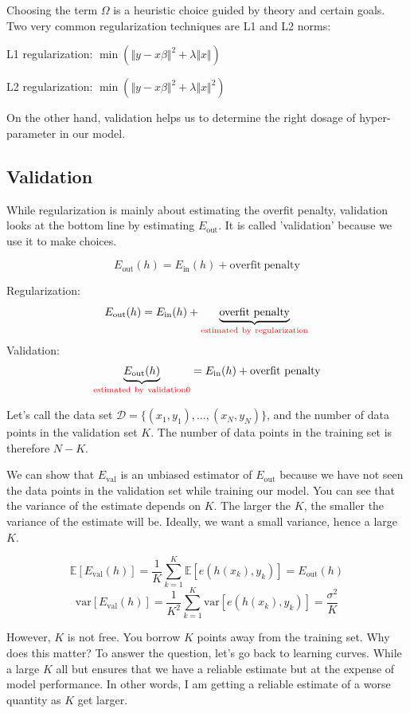 \documentclass[10pt]{article}
\numberwithin{equation}{section}  %
\begin{document}
Choosing the term $\Omega$ is a heuristic choice guided by theory and certain goals. Two very common regularization techniques are L1 and L2 norms:

L1 regularization: $\min(\Vert y-x\beta\Vert^2 + \lambda\Vert x\Vert)$

L2 regularization: $\min(\Vert y-x\beta\Vert^2 + \lambda\Vert x\Vert^2)$

On the other hand, validation helps us to determine the right dosage of hyper-parameter in our model.

\subsection{Validation}

While regularization is mainly about estimating the overfit penalty, validation looks at the bottom line by estimating $E_\mathrm{out}$. It is called 'validation' because we use it to make choices.

\[
    E_\mathrm{out}(h) = E_\mathrm{in}(h) + \mathrm{overfit\ penalty}
\]

Regularization:
\[
    E_\mathrm{out}(h) = E_\mathrm{in}(h) + \underbrace{\mathrm{overfit\ penalty}}_{\textcolor{red}{\mathrm{estimated\ by\ regularization}}}
\]
Validation:
\[
    \underbrace{E_\mathrm{out}(h)}_{\textcolor{red}{\mathrm{estimated\ by\ validation0}}} = E_\mathrm{in}(h) + \mathrm{overfit\ penalty}
\]

Let's call the data set $\mathcal{D}=\{(x_1,y_1),\dots,(x_N,y_N)\}$, and the number of data points in the validation set $K$. The number of data points in the training set is therefore $N-K$.

We can show that $E_\mathrm{val}$ is an unbiased estimator of $E_\mathrm{out}$ because we have not seen the data points in the validation set while training our model. You can see that the variance of the estimate depends on $K$. The larger the $K$, the smaller the variance of the estimate will be. Ideally, we want a small variance, hence a large $K$.

\[
    \mathbb{E}\left[E_\mathrm{val}(h)\right] = \frac{1}{K} \displaystyle\sum_{k=1}^K\mathbb{E}\left[ e(h(x_k),y_k) \right] = E_\mathrm{out}(h)
\]
\[
    \mathrm{var}\left[E_\mathrm{val}(h)\right] = \frac{1}{K^2} \displaystyle\sum_{k=1}^K\mathrm{var}\left[ e(h(x_k),y_k) \right] = \frac{\sigma^2}{K}
\]

However, $K$ is not free. You borrow $K$ points away from the training set. Why does this matter? To answer the question, let's go back to learning curves. While a large $K$ all but ensures that we have a reliable estimate but at the expense of model performance. In other words, I am getting a reliable estimate of a worse quantity as $K$ get larger.
\end{document}
